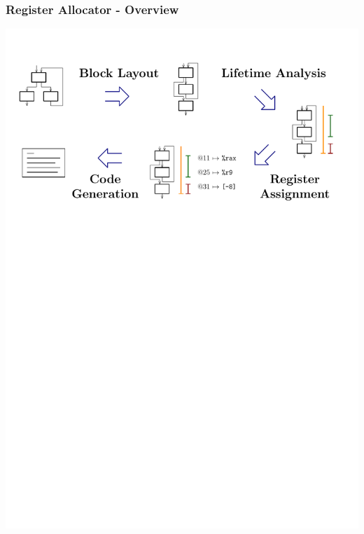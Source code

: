 \documentclass[navbaroff,en]{sdqbeamer}
\begin{document}
\begin{frame}
\frametitle{Register Allocator - Overview}

\centering \includegraphics[scale=0.7]{images/overview.pdf}

\end{frame}
\end{document}
